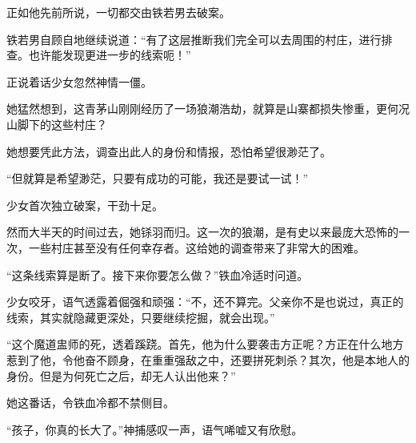 \begin{this_body}
正如他先前所说，一切都交由铁若男去破案。

铁若男自顾自地继续说道：“有了这层推断我们完全可以去周围的村庄，进行排查。也许能发现更进一步的线索呃！”

正说着话少女忽然神情一僵。

她猛然想到，这青茅山刚刚经历了一场狼潮浩劫，就算是山寨都损失惨重，更何况山脚下的这些村庄？

她想要凭此方法，调查出此人的身份和情报，恐怕希望很渺茫了。

“但就算是希望渺茫，只要有成功的可能，我还是要试一试！”

少女首次独立破案，干劲十足。

然而大半天的时间过去，她铩羽而归。这一次的狼潮，是有史以来最庞大恐怖的一次，一些村庄甚至没有任何幸存者。这给她的调查带来了非常大的困难。

“这条线索算是断了。接下来你要怎么做？”铁血冷适时问道。

少女咬牙，语气透露着倔强和顽强：“不，还不算完。父亲你不是也说过，真正的线索，其实就隐藏更深处，只要继续挖掘，就会出现。”

“这个魔道盅师的死，透着蹊跷。首先，他为什么要袭击方正呢？方正在什么地方惹到了他，令他奋不顾身，在重重强敌之中，还要拼死刺杀？其次，他是本地人的身份。但是为何死亡之后，却无人认出他来？”

她这番话，令铁血冷都不禁侧目。

“孩子，你真的长大了。”神捕感叹一声，语气唏嘘又有欣慰。

\end{this_body}


